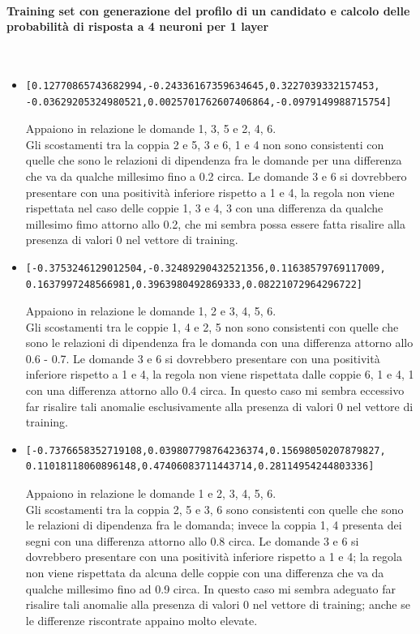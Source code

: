 \paragraph{Training set con generazione del profilo di un candidato e calcolo delle probabilit\`a di risposta a 4 neuroni per 1 layer}\mbox{}
\label{Training set con generazione del profilo di un candidato e calcolo delle probabilita di risposta a 4 neuroni per 1 layer}
\\
\noindent
\begin{itemize}
\item \begin{verbatim}[0.12770865743682994,-0.24336167359634645,0.3227039332157453,
-0.03629205324980521,0.0025701762607406864,-0.0979149988715754]
\end{verbatim}
Appaiono in relazione le domande 1, 3, 5 e 2, 4, 6.\\
Gli scostamenti tra la coppia 2 e 5, 3 e 6, 1 e 4 non sono consistenti con quelle che sono le relazioni di dipendenza fra le domande per una differenza  che va da qualche millesimo fino a 0.2 circa.
Le domande 3 e 6 si dovrebbero presentare con una positivit\`a inferiore rispetto a 1 e 4, la regola non viene rispettata nel caso delle coppie 1, 3 e 4, 3 con una differenza da qualche millesimo fimo attorno allo 0.2, che mi sembra possa essere fatta risalire alla presenza di valori 0 nel vettore di training.

\item \begin{verbatim}[-0.3753246129012504,-0.32489290432521356,0.11638579769117009,
0.1637997248566981,0.3963980492869333,0.08221072964296722]
\end{verbatim}
Appaiono in relazione le domande 1, 2 e 3, 4, 5, 6.\\
Gli scostamenti tra le coppie 1, 4 e 2, 5 non sono consistenti con quelle che sono le relazioni di dipendenza fra le domanda con una differenza attorno allo 0.6 - 0.7.
Le domande 3 e 6 si dovrebbero presentare con una positivit\`a inferiore rispetto a 1 e 4, la regola non viene rispettata dalle coppie 6, 1 e 4, 1 con una differenza attorno allo 0.4 circa. In questo caso mi sembra eccessivo far risalire tali anomalie esclusivamente alla presenza di valori 0 nel vettore di training.

\item \begin{verbatim}[-0.7376658352719108,0.039807798764236374,0.15698050207879827,
0.11018118060896148,0.47406083711443714,0.28114954244803336]
\end{verbatim}
Appaiono in relazione le domande 1 e 2, 3, 4, 5, 6.\\
Gli scostamenti tra la coppia 2, 5 e 3, 6 sono consistenti con quelle che sono le relazioni di dipendenza fra le domanda; invece la coppia 1, 4 presenta dei segni con una differenza attorno allo 0.8 circa.
Le domande 3 e 6 si dovrebbero presentare con una positivit\`a inferiore rispetto a 1 e 4; la regola non viene rispettata da alcuna delle coppie con una differenza che va da qualche millesimo fino ad 0.9 circa. In questo caso  mi sembra adeguato far risalire tali anomalie alla presenza di valori 0 nel vettore di training; anche se le differenze riscontrate appaino molto elevate.



\end{itemize}
